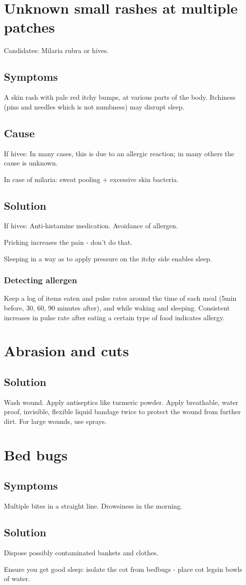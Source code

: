 \documentclass[oneside, article]{memoir}
\begin{document}
\section{Unknown small rashes at multiple patches}
Candidates: Milaria rubra or hives.

\subsection{Symptoms}
A skin rash with pale red itchy bumps, at various parts of the body. Itchiness (pins and needles which is not numbness) may disrupt sleep.

\subsection{Cause}
If hives: In many cases, this is due to an allergic reaction; in many others the cause is unknown.

In case of milaria: sweat pooling + excessive skin bacteria.

\subsection{Solution}
If hives: Anti-histamine medication. Avoidance of allergen.

Pricking increases the pain - don't do that.

Sleeping in a way as to apply pressure on the itchy side enables sleep.

\subsubsection{Detecting allergen}
Keep a log of items eaten and pulse rates around the time of each meal (5min before, 30, 60, 90 minutes after), and while waking and sleeping. Consistent increases in pulse rate after eating a certain type of food indicates allergy.


\section{Abrasion and cuts}
\subsection{Solution}
Wash wound. Apply antiseptics like turmeric powder. Apply breathable, water proof, invisible, flexible liquid bandage twice to protect the wound from further dirt. For large wounds, use sprays.

\section{Bed bugs}
\subsection{Symptoms}
Multiple bites in a straight line. Drowsiness in the morning.

\subsection{Solution}
Dispose possibly contaminated bankets and clothes.

Ensure you get good sleep: isolate the cot from bedbugs - place cot legsin bowls of water.
\end{document}
